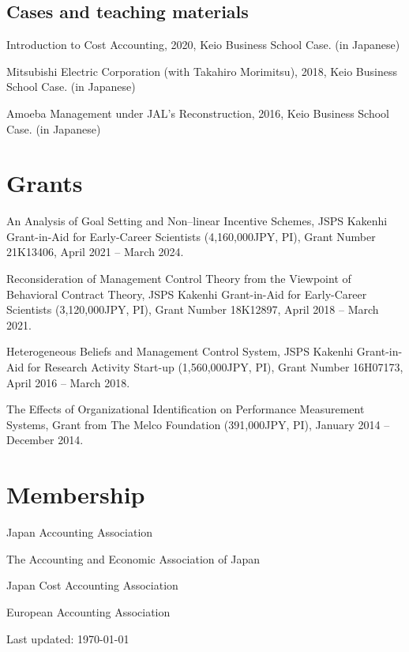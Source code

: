 \documentclass[letterpaper,uplatex]{article}
\def\footerlink{http://jblevins.org/projects/cv-template/}
\renewenvironment{itemize}{
  \begin{list}{}{
    \setlength{\leftmargin}{1.5em}
  }
}{
  \end{list}
}
\begin{document}
\subsection*{Cases and teaching materials}

\begin{itemize}
   \item Introduction to Cost Accounting, 2020, Keio Business School Case. (in Japanese)
   \item Mitsubishi Electric Corporation (with Takahiro Morimitsu), 2018, Keio Business School Case. (in Japanese)
   \item Amoeba Management under JAL's Reconstruction, 2016, Keio Business School Case. (in Japanese)
\end{itemize}

\section*{Grants}

\begin{itemize}
\item An Analysis of Goal Setting and Non--linear Incentive Schemes, JSPS Kakenhi Grant-in-Aid for Early-Career Scientists (4,160,000JPY, PI), Grant Number 21K13406, April 2021 -- March 2024.

\item Reconsideration of Management Control Theory from the Viewpoint of Behavioral Contract Theory, JSPS Kakenhi Grant-in-Aid for Early-Career Scientists (3,120,000JPY, PI), Grant Number 18K12897, April 2018 -- March 2021.

\item Heterogeneous Beliefs and Management Control System, JSPS Kakenhi Grant-in-Aid for Research Activity Start-up (1,560,000JPY, PI), Grant Number 16H07173, April 2016 -- March 2018.

\item The Effects of Organizational Identification on Performance Measurement Systems, Grant from The Melco Foundation (391,000JPY, PI), January 2014 -- December 2014.
\end{itemize}

\section*{Membership}

\begin{itemize}
\item Japan Accounting Association
\item The Accounting and Economic Association of Japan
\item Japan Cost Accounting Association
\item European Accounting Association
\end{itemize}

\bigskip

\begin{center}
  \begin{footnotesize}
    Last updated: \today \\
  \end{footnotesize}
\end{center}
\end{document}
